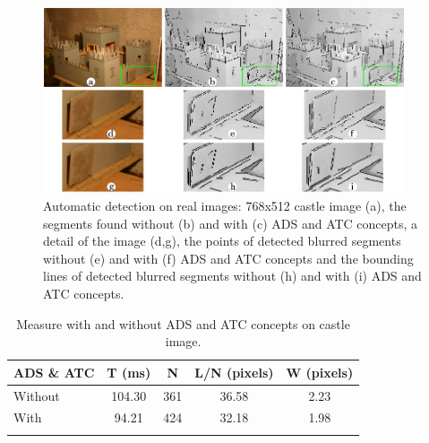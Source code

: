\documentclass[11pt]{article}
\begin{document}
\begin{figure}
  \begin{center}
  \includegraphics[width=0.95\textwidth]{Images/expe2.png}
  \end{center}
  \caption{Automatic detection on real images: 768x512 castle image (a), the segments found without (b) and with (c) ADS and ATC concepts, a detail of the image (d,g), the points of detected blurred segments without (e) and with (f) ADS and ATC concepts and the bounding lines of detected blurred segments without (h) and with (i) ADS and ATC concepts.}
\label{fig:castle}
\end{figure}


\begin{longtable}[]{l|cccc}
\toprule
\begin{minipage}[b]{0.18\columnwidth}\raggedright
ADS \& ATC \strut
\end{minipage} & \begin{minipage}[b]{0.14\columnwidth}\centering
T (ms) \strut
\end{minipage} & \begin{minipage}[b]{0.14\columnwidth}\centering
N \strut
\end{minipage} & \begin{minipage}[b]{0.14\columnwidth}\centering
L/N (pixels) \strut
\end{minipage} & \begin{minipage}[b]{0.14\columnwidth}\centering
W (pixels) \strut
\end{minipage} \tabularnewline
\midrule
Without & 104.30 & 361 & 36.58 & 2.23 \tabularnewline
With & 94.21 & 424 & 32.18 & 1.98 \tabularnewline
\bottomrule

\caption{Measure with and without ADS and ATC concepts on castle image.}
\label{tab:castle}
\end{longtable}




\end{document}
